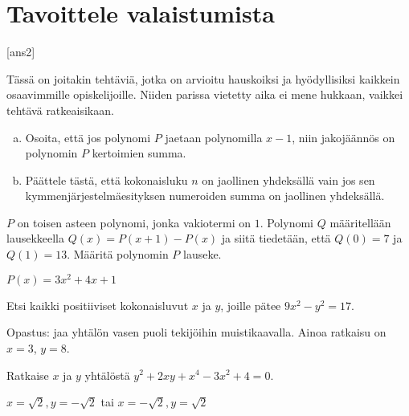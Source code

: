 \section{Tavoittele valaistumista}

[ans2]

Tässä on joitakin tehtäviä, jotka on arvioitu hauskoiksi ja hyödyllisiksi kaikkein osaavimmille opiskelijoille. Niiden parissa vietetty aika ei mene hukkaan, vaikkei tehtävä ratkeaisikaan.

\begin{tehtava}
    \begin{enumerate}[a)]
        \item Osoita, että jos polynomi $P$ jaetaan polynomilla $x-1$, niin jakojäännös on polynomin $P$ kertoimien summa.
        \item Päättele tästä, että kokonaisluku $n$ on jaollinen yhdeksällä vain jos sen kymmenjärjestelmäesityksen numeroiden summa on jaollinen yhdeksällä.
    \end{enumerate}
\end{tehtava}

\begin{tehtava} %
    $P$ on toisen asteen polynomi, jonka vakiotermi on $1$. Polynomi $Q$ määritellään lausekkeella $Q(x)=P(x+1)-P(x)$ ja siitä tiedetään, että $Q(0)=7$ ja $Q(1)=13$. Määritä polynomin $P$ lauseke.
    \begin{vastaus}
        $P(x) = 3x^2+4x+1$
    \end{vastaus}
\end{tehtava}

\begin{tehtava} %
    Etsi kaikki positiiviset kokonaisluvut $x$ ja $y$, joille pätee $9x^2-y^2=17$.
    \begin{vastaus}
    Opastus: jaa yhtälön vasen puoli tekijöihin muistikaavalla. 
    Ainoa ratkaisu on $x = 3$, $y=8$.
    \end{vastaus}
\end{tehtava}

\begin{tehtava} %
    Ratkaise $x$ ja $y$ yhtälöstä $y^2+2xy+x^4-3x^2+4=0$.
    \begin{vastaus}
        $x=\sqrt{2}, y=-\sqrt{2}$ tai $x=-\sqrt{2}, y=\sqrt{2}$
    \end{vastaus}
\end{tehtava}

